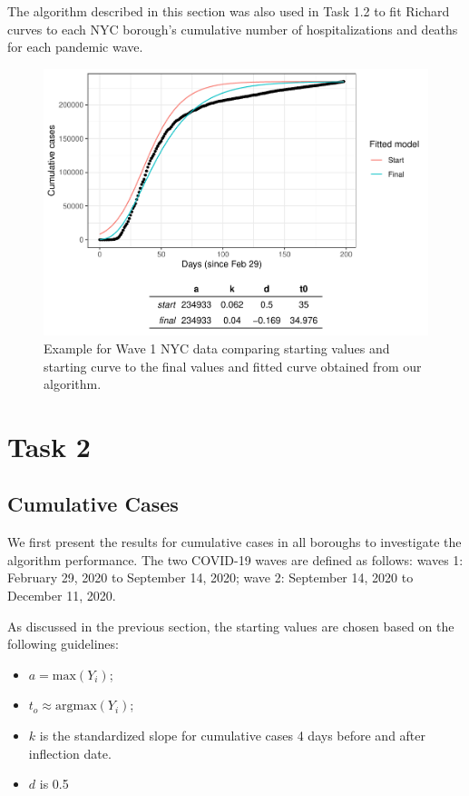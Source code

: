 \documentclass[
]{article}
\providecommand{\tightlist}{%
  \setlength{\itemsep}{0pt}\setlength{\parskip}{0pt}}
\begin{document}
The algorithm described in this section was also used in Task 1.2 to fit
Richard curves to each NYC borough's cumulative number of
hospitalizations and deaths for each pandemic wave.

\begin{figure}
\centering
\includegraphics{report_files/figure-latex/unnamed-chunk-5-1.pdf}
\caption{Example for Wave 1 NYC data comparing starting values and
starting curve to the final values and fitted curve obtained from our
algorithm.}
\end{figure}

\hypertarget{task-2}{%
\section{Task 2}\label{task-2}}

\hypertarget{cumulative-cases}{%
\subsection{Cumulative Cases}\label{cumulative-cases}}

We first present the results for cumulative cases in all boroughs to
investigate the algorithm performance. The two COVID-19 waves are
defined as follows: waves 1: February 29, 2020 to September 14, 2020;
wave 2: September 14, 2020 to December 11, 2020.

As discussed in the previous section, the starting values are chosen
based on the following guidelines:

\begin{itemize}
\tightlist
\item
  \(a = \text{max}(Y_i)\);
\item
  \(t_o \approx \text{argmax}(Y_i)\);
\item
  \(k\) is the standardized slope for cumulative cases 4 days before and
  after inflection date.
\item
  \(d\) is 0.5
\end{itemize}
\end{document}

